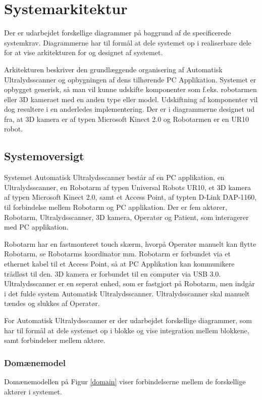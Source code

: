 \chapter{Systemarkitektur}\label{Systemarkitektur}
Der er udarbejdet forskellige diagrammer på baggrund af de specificerede systemkrav.  Diagrammerne har til formål at dele systemet op i realiserbare dele for at vise arkitekturen for og designet af systemet. 

Arkitekturen beskriver den grundlæggende organisering af Automatisk Ultralydsscanner og opbygningen af dens tilhørende PC Applikation. Systemet er opbygget generisk, så man vil kunne udskifte komponenter som f.eks. robotarmen eller 3D kameraet med en anden type eller model. Udskiftning af komponenter vil dog resultere i en anderledes implementering. Der er i diagrammerne designet ud fra, at 3D kamera er af typen Microsoft Kinect 2.0 og Robotarmen er en UR10 robot. 

\section{Systemoversigt}
Systemet Automatisk Ultralydsscanner består af en PC applikation, en Ultralydsscanner, en Robotarm af typen Universal Robots UR10, et 3D kamera af typen Microsoft Kinect 2.0, samt et Access Point, af typten D-Link DAP-1160, til forbindelse mellem Robotarm og PC applikation. Der er fem aktører, Robotarm, Ultralydsscanner, 3D kamera, Operatør og Patient, som interagerer med PC applikation.

Robotarm har en fastmonteret touch skærm, hvorpå Operatør manuelt kan flytte Robotarm, se Robotarms koordinator mm. Robotarm er forbundet via et ethernet kabel til et Access Point, så at PC Applikation kan kommunikere trådløst til den. 3D kamera er forbundet til en computer via USB 3.0. Ultralydsscanner er en seperat enhed, som er fastgjort på Robotarm, men indgår i det fulde system Automatisk Ultralydsscanner. Ultralydsscanner skal manuelt tændes og slukkes af Operatør.

For Automatisk Ultralydsscanner er der udarbejdet forskellige diagrammer, som har til formål at dele systemet op i blokke og vise integration mellem blokkene, samt forbindelser mellem aktøre. 

\subsection{Domænemodel}
Domænemodellen på Figur \ref{domain} viser forbindelserne mellem de forskellige aktører i systemet. 

